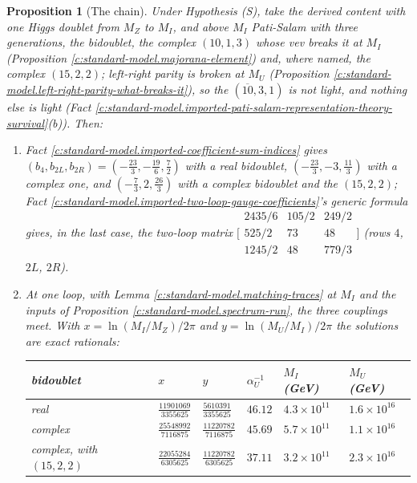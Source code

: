 \documentclass[11pt]{article}
\newtheorem{proposition}[theorem]{Proposition}
\theoremstyle{definition}
\theoremstyle{plain}
\newcommand{\changedmark}[2]{\marginpar{\raggedright\scriptsize\color{#1}#2}}
\begin{document}
\begin{proposition}[The chain]\label{c:standard-model.chain}
\changedmark{gray}{reworded}
Under Hypothesis (S), take the derived content with one Higgs doublet from $M_{Z}$ to $M_{I}$, and above $M_{I}$ Pati-Salam with three generations, the bidoublet, the complex $(10,1,3)$ whose vev breaks it at $M_{I}$ (Proposition \ref{c:standard-model.majorana-element}) and, where named, the complex $(15,2,2)$; left-right parity is broken at $M_{U}$ (Proposition \ref{c:standard-model.left-right-parity-what-breaks-it}), so the $(\overline{10},3,1)$ is not light, and nothing else is light (Fact \ref{c:standard-model.imported-pati-salam-representation-theory-survival}(b)). Then:
\begin{enumerate}
\item[(1)] Fact \ref{c:standard-model.imported-coefficient-sum-indices} gives $(b_{4}, b_{2L}, b_{2R}) = (-\tfrac{23}{3}, -\tfrac{19}{6}, \tfrac72)$ with a real bidoublet, $(-\tfrac{23}{3}, -3, \tfrac{11}{3})$ with a complex one, and $(-\tfrac73, 2, \tfrac{26}{3})$ with a complex bidoublet and the $(15,2,2)$; Fact \ref{c:standard-model.imported-two-loop-gauge-coefficients}'s generic formula gives, in the last case, the two-loop matrix $\bigl[\begin{smallmatrix} 2435/6 & 105/2 & 249/2 \\ 525/2 & 73 & 48 \\ 1245/2 & 48 & 779/3 \end{smallmatrix}\bigr]$ (rows $4$, $2L$, $2R$).
\item[(2)] At one loop, with Lemma \ref{c:standard-model.matching-traces} at $M_{I}$ and the inputs of Proposition \ref{c:standard-model.spectrum-run}, the three couplings meet. With $x = \ln(M_{I}/M_{Z})/2\pi$ and $y = \ln(M_{U}/M_{I})/2\pi$ the solutions are exact rationals:
\begin{center}\small
\begin{tabular}{@{}llllll@{}}
\toprule
bidoublet & $x$ & $y$ & $\alpha_{U}^{-1}$ & $M_{I}$ (GeV) & $M_{U}$ (GeV) \\
\midrule
real & $\tfrac{11901069}{3355625}$ & $\tfrac{5610391}{3355625}$ & $46.12$ & $4.3 \times 10^{11}$ & $1.6 \times 10^{16}$ \\[2pt]
complex & $\tfrac{25548992}{7116875}$ & $\tfrac{11220782}{7116875}$ & $45.69$ & $5.7 \times 10^{11}$ & $1.1 \times 10^{16}$ \\[2pt]
complex, with $(15,2,2)$ & $\tfrac{22055284}{6305625}$ & $\tfrac{11220782}{6305625}$ & $37.11$ & $3.2 \times 10^{11}$ & $2.3 \times 10^{16}$ \\

\end{tabular}
\end{center}
\end{enumerate}
\end{proposition}
\end{document}
